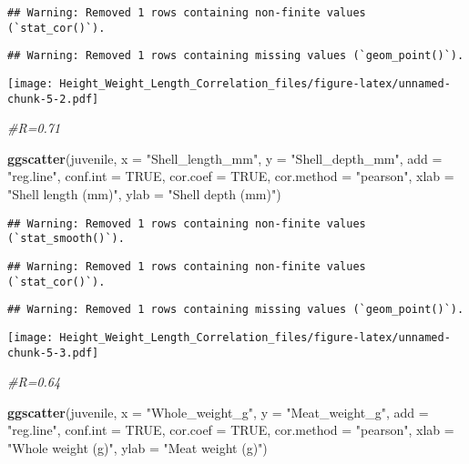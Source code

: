 \documentclass[
]{article}
\newenvironment{Shaded}{\begin{snugshade}}{\end{snugshade}}
\newcommand{\AttributeTok}[1]{\textcolor[rgb]{0.13,0.29,0.53}{#1}}
\newcommand{\CommentTok}[1]{\textcolor[rgb]{0.56,0.35,0.01}{\textit{#1}}}
\newcommand{\ConstantTok}[1]{\textcolor[rgb]{0.56,0.35,0.01}{#1}}
\newcommand{\FunctionTok}[1]{\textcolor[rgb]{0.13,0.29,0.53}{\textbf{#1}}}
\newcommand{\NormalTok}[1]{#1}
\newcommand{\StringTok}[1]{\textcolor[rgb]{0.31,0.60,0.02}{#1}}
\begin{document}
\begin{verbatim}
## Warning: Removed 1 rows containing non-finite values (`stat_cor()`).
\end{verbatim}

\begin{verbatim}
## Warning: Removed 1 rows containing missing values (`geom_point()`).
\end{verbatim}

\texttt{[image: Height\_Weight\_Length\_Correlation\_files/figure-latex/unnamed-chunk-5-2.pdf]}

\begin{Shaded}
\begin{Highlighting}[]
\CommentTok{\#R=0.71}

\FunctionTok{ggscatter}\NormalTok{(juvenile, }\AttributeTok{x =} \StringTok{"Shell\_length\_mm"}\NormalTok{, }\AttributeTok{y =} \StringTok{"Shell\_depth\_mm"}\NormalTok{, }
          \AttributeTok{add =} \StringTok{"reg.line"}\NormalTok{, }\AttributeTok{conf.int =} \ConstantTok{TRUE}\NormalTok{, }
          \AttributeTok{cor.coef =} \ConstantTok{TRUE}\NormalTok{, }\AttributeTok{cor.method =} \StringTok{"pearson"}\NormalTok{,}
          \AttributeTok{xlab =} \StringTok{"Shell length (mm)"}\NormalTok{, }\AttributeTok{ylab =} \StringTok{"Shell depth (mm)"}\NormalTok{)}
\end{Highlighting}
\end{Shaded}

\begin{verbatim}
## Warning: Removed 1 rows containing non-finite values (`stat_smooth()`).
\end{verbatim}

\begin{verbatim}
## Warning: Removed 1 rows containing non-finite values (`stat_cor()`).
\end{verbatim}

\begin{verbatim}
## Warning: Removed 1 rows containing missing values (`geom_point()`).
\end{verbatim}

\texttt{[image: Height\_Weight\_Length\_Correlation\_files/figure-latex/unnamed-chunk-5-3.pdf]}

\begin{Shaded}
\begin{Highlighting}[]
\CommentTok{\#R=0.64}

\FunctionTok{ggscatter}\NormalTok{(juvenile, }\AttributeTok{x =} \StringTok{"Whole\_weight\_g"}\NormalTok{, }\AttributeTok{y =} \StringTok{"Meat\_weight\_g"}\NormalTok{, }
          \AttributeTok{add =} \StringTok{"reg.line"}\NormalTok{, }\AttributeTok{conf.int =} \ConstantTok{TRUE}\NormalTok{, }
          \AttributeTok{cor.coef =} \ConstantTok{TRUE}\NormalTok{, }\AttributeTok{cor.method =} \StringTok{"pearson"}\NormalTok{,}
          \AttributeTok{xlab =} \StringTok{"Whole weight (g)"}\NormalTok{, }\AttributeTok{ylab =} \StringTok{"Meat weight (g)"}\NormalTok{)}
\end{Highlighting}
\end{Shaded}
\end{document}
